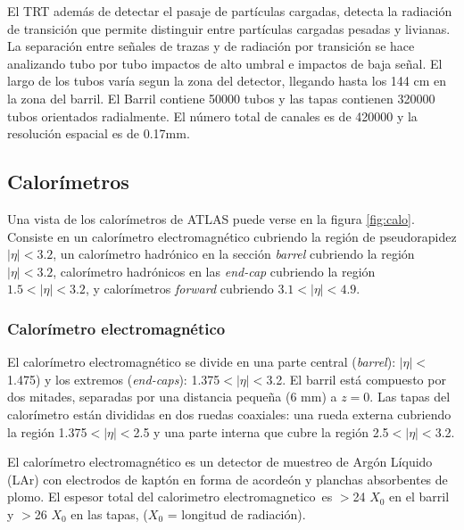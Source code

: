 El TRT además de detectar el pasaje de partículas cargadas, detecta la radiación
de transición que permite distinguir entre partículas cargadas pesadas y
livianas. La separación entre señales de trazas y de radiación por transición se
hace analizando tubo por tubo impactos de alto umbral e impactos de baja señal.
El largo de los tubos varía segun la zona del detector, llegando hasta los 144
cm en la zona del barril. El Barril contiene 50000 tubos y las tapas contienen
320000 tubos orientados radialmente. El número total de canales es de 420000 y
la resolución espacial es de 0.17mm.


\subsection{Calorímetros}

Una vista de los calorímetros de ATLAS puede verse en la figura \ref{fig:calo}.
Consiste en un calorímetro electromagnético cubriendo la región de pseudorapidez
$|\eta| < 3.2$, un calorímetro hadrónico en la sección \emph{barrel} cubriendo
la región $|\eta| < 3.2$, calorímetro hadrónicos en las \emph{end-cap} cubriendo
la región $1.5 < |\eta| < 3.2$, y calorímetros \emph{forward} cubriendo $3.1 <
|\eta| < 4.9$.



\subsubsection{Calorímetro electromagnético}
El calorímetro electromagnético \cite{caloemTDR} se divide en una parte central
(\emph{barrel}): $|\eta|<$1.475) y los extremos (\emph{end-caps}):
1.375$<|\eta|<$3.2. El barril está compuesto por dos mitades, separadas por una
distancia pequeña (6 mm) a $z = 0$. Las tapas del calorímetro están divididas en
dos ruedas coaxiales: una rueda externa cubriendo la región 1.375$<|\eta|<$2.5 y
una parte interna que cubre la región 2.5$<|\eta|<$3.2.

El calorímetro electromagnético es un detector de muestreo de Argón Líquido
(LAr) con electrodos de kaptón en forma de acordeón y planchas absorbentes de
plomo. El espesor total del calorimetro electromagnetico\ es $>$24 $X_0$ en el
barril y $>$26 $X_0$ en las tapas, ($X_0$ = longitud de radiación).

